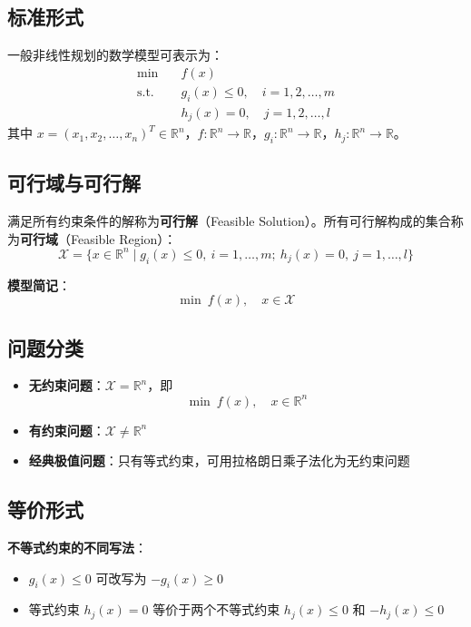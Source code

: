 \subsection{标准形式}

一般非线性规划的数学模型可表示为：
\[
\begin{aligned}
\min\quad & f(x) \\
\text{s.t.}\quad & g_i(x) \leq 0,\quad i=1,2,\ldots,m \\
& h_j(x) = 0,\quad j=1,2,\ldots,l
\end{aligned}
\]
其中 $x = (x_1, x_2, \ldots, x_n)^T \in \mathbb{R}^n$，$f: \mathbb{R}^n \to \mathbb{R}$，$g_i: \mathbb{R}^n \to \mathbb{R}$，$h_j: \mathbb{R}^n \to \mathbb{R}$。

\subsection{可行域与可行解}

\begin{definition}[可行域]
满足所有约束条件的解称为\textbf{可行解}（Feasible Solution）。所有可行解构成的集合称为\textbf{可行域}（Feasible Region）：
\[
\mathcal{X} = \{x \in \mathbb{R}^n \mid g_i(x) \leq 0,\ i=1,\ldots,m;\ h_j(x)=0,\ j=1,\ldots,l\}
\]
\end{definition}

\textbf{模型简记}：
\[
\min\ f(x),\quad x \in \mathcal{X}
\]

\subsection{问题分类}

\begin{conceptbox}[分类标准]
\begin{itemize}[itemsep=0.3em]
    \item \textbf{无约束问题}：$\mathcal{X} = \mathbb{R}^n$，即
    \[\min\ f(x),\quad x \in \mathbb{R}^n\]
    \item \textbf{有约束问题}：$\mathcal{X} \neq \mathbb{R}^n$
    \item \textbf{经典极值问题}：只有等式约束，可用拉格朗日乘子法化为无约束问题
\end{itemize}
\end{conceptbox}

\subsection{等价形式}

\textbf{不等式约束的不同写法}：
\begin{itemize}[itemsep=0.3em]
    \item $g_i(x) \leq 0$ 可改写为 $-g_i(x) \geq 0$
    \item 等式约束 $h_j(x) = 0$ 等价于两个不等式约束 $h_j(x) \leq 0$ 和 $-h_j(x) \leq 0$
\end{itemize}

